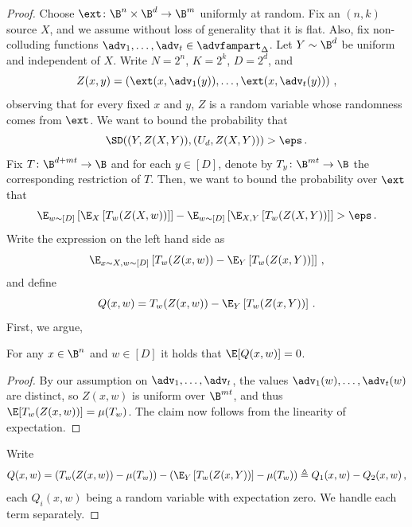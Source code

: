 \documentclass{toc}
\begin{document}
\begin{proof}
Choose $\ext \colon \B^{n} \times \B^{d} \rightarrow \B^{m}$ uniformly at random.
Fix an $(n,k)$ source $X$, and we assume without loss of generality that it is flat. Also, fix non-colluding functions $\adv_1,\ldots,\adv_t \in \advfampart_{\Delta}$. Let $Y \sim \B^{d}$ be uniform and independent of $X$.
Write $N = 2^n$, $K = 2^k$, $D = 2^d$, and
\[
Z(x,y) = \left( \ext(x,\adv_1(y)),\ldots,\ext(x,\adv_t(y)) \right)\,,
\]
observing that for every fixed $x$ and $y$, $Z$ is a random variable whose
randomness comes from $\ext$. We want to bound the probability that
\[
\SD( (Y,Z(X,Y)),(U_d,Z(X,Y)) ) > \eps\,.
\]
Fix $T \colon \B^{d+mt}\rightarrow\B$ and for each $y \in [D]$, denote by
$T_y \colon \B^{mt} \rightarrow \B$ the corresponding restriction of $T$.
Then, we want to bound the probability over $\ext$ that
\[
\E_{w \sim [D]}\left[ \E_{X}\left[ T_{w}(Z(X,w)) \right] \right] - \E_{w \sim [D]}\left[ \E_{X,Y}\left[ T_{w}(Z(X,Y)) \right] \right] > \eps\,.
\]
Write the expression on the left hand side as
\[
\E_{x \sim X,w \sim [D]}\left[ T_{w}(Z(x,w)) - \E_{Y}\left[ T_{w}(Z(x,Y)) \right] \right]\,,
\]
and define
\[
Q(x,w) = T_{w}(Z(x,w)) - \E_{Y}\left[ T_{w}(Z(x,Y)) \right] \,.
\]
First, we argue,
\begin{claim}
For any $x \in \B^n$ and $w \in [D]$ it holds that $\E[Q(x,w)] = 0$.
\end{claim}
\begin{proof}
By our assumption on $\adv_1,\ldots,\adv_t$, the values $\adv_{1}(w),\ldots,\adv_{t}(w)$ 
are distinct, so $Z(x,w)$ is uniform over $\B^{mt}$, and thus $\E[T_{w}(Z(x,w))] = \mu(T_w)$.
The claim now follows from the linearity of expectation.
\end{proof}

Write
\[
Q(x,w) =\left( T_{w}(Z(x,w)) - \mu(T_w) \right) - \left( \E_{Y}\left[ T_{w}(Z(x,Y)) \right] - \mu(T_w) \right) 
\triangleq Q_{1}(x,w) - Q_{2}(x,w)\,,
\]
each $Q_{i}(x,w)$ being a random variable with expectation zero. We handle each term
separately.

%

\end{proof}
\end{document}
